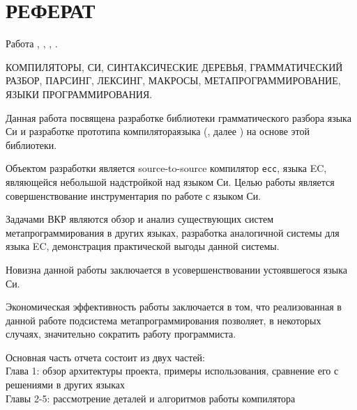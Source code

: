 \chapter*{РЕФЕРАТ}

Работа , 
    ,
    ,
    .

    КОМПИЛЯТОРЫ, СИ, СИНТАКСИЧЕСКИЕ ДЕРЕВЬЯ, ГРАММАТИЧЕСКИЙ РАЗБОР, ПАРСИНГ, ЛЕКСИНГ, МАКРОСЫ, МЕТАПРОГРАММИРОВАНИЕ, ЯЗЫКИ ПРОГРАММИРОВАНИЯ. %

Данная работа посвящена разработке библиотеки грамматического разбора языка Си и разработке прототипа компилятора\break языка  (, далее ) на основе этой библиотеки.

Объектом разработки является source-to-source компилятор \verb|ecc|, языка EC, являющейся небольшой надстройкой над языком Си.
Целью работы является совершенствование инструментария по работе с языком Си.

Задачами ВКР являются обзор и анализ существующих систем метапрограммирования в других языках, 
разработка аналогичной системы для языка EC,
демонстрация практической выгоды данной системы.

Новизна данной работы заключается в усовершенствовании устоявшегося языка Си.

Экономическая эффективность работы заключается в том, что реализованная в данной работе подсистема метапрограммирования позволяет, в некоторых случаях, значительно сократить работу программиста. %

Основная часть отчета состоит из двух частей:\\
Глава 1: обзор архитектуры проекта, примеры использования, сравнение его с решениями в других языках\\
Главы 2-5: рассмотрение деталей и алгоритмов работы компилятора


